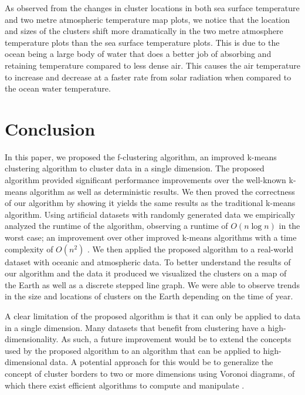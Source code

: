 \documentclass[conference,compsoc]{IEEEtran}
\begin{document}
As observed from the changes in cluster locations in both sea surface temperature and two metre atmospheric temperature map plots, we notice that the location and sizes of the clusters shift more dramatically in the two metre atmosphere temperature plots than the sea surface temperature plots. This is due to the ocean being a large body of water that does a better job of absorbing and retaining temperature compared to less dense air. This causes the air temperature to increase and decrease at a faster rate from solar radiation when compared to the ocean water temperature.



\section{Conclusion}

In this paper, we proposed the f-clustering algorithm, an improved k-means clustering algorithm to cluster data in a single dimension. The proposed algorithm provided significant performance improvements over the well-known k-means algorithm as well as deterministic results. We then proved the correctness of our algorithm by showing it yields the same results as the traditional k-means algorithm. Using artificial datasets with randomly generated data we empirically analyzed the runtime of the algorithm, observing a runtime of $O(n \log n)$ in the worst case; an improvement over other improved k-means algorithms with a time complexity of $O(n^2)$ \cite{b1}. We then applied the proposed algorithm to a real-world dataset with oceanic and atmospheric data. To better understand the results of our algorithm and the data it produced we visualized the clusters on a map of the Earth as well as a discrete stepped line graph. We were able to observe trends in the size and locations of clusters on the Earth depending on the time of year.

A clear limitation of the proposed algorithm is that it can only be applied to data in a single dimension. Many datasets that benefit from clustering have a high-dimensionality. As such, a future improvement would be to extend the concepts used by the proposed algorithm to an algorithm that can be applied to high-dimensional data. A potential approach for this would be to generalize the concept of cluster borders to two or more dimensions using Voronoi diagrams, of which there exist efficient algorithms to compute and manipulate \cite{b10}.
\end{document}
